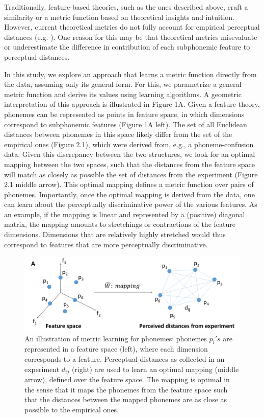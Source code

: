 Traditionally, feature-based theories, such as the ones described above, craft a similarity or a metric function based on theoretical insights and intuition. However, current theoretical metrics do not fully account for empirical perceptual distances (e.g. \citealp{Bailey2005}). One reason for this may be that theoretical metrics misevaluate or underestimate the difference in contribution of each subphonemic feature to perceptual distances. 

In this study, we explore an approach that learns a metric function directly from the data, assuming only its general form. For this, we parametrize a general metric function and derive its values using learning algorithms. A geometric interpretation of this approach is illustrated in Figure 1A. Given a feature theory, phonemes can be represented as points in feature space, in which dimensions correspond to subphonemic features (Figure 1A left). The set of all Euclidean distances between phonemes in this space likely differ from the set of the empirical ones (Figure 2.1), which were derived from, e.g., a phoneme-confusion data. Given this discrepancy between the two structures, we look for an optimal mapping between the two spaces, such that the distances from the feature space will match as closely as possible the set of distances from the experiment (Figure 2.1 middle arrow). This optimal mapping defines a metric function over pairs of phonemes. Importantly, once the optimal mapping is derived from the data, one can learn about the perceptually discriminative power of the various features. As an example, if the mapping is linear and represented by a (positive) diagonal matrix, the mapping amounts to stretchings or contractions of the feature dimensions. Dimensions that are relatively highly stretched would thus correspond to features that are more perceptually discriminative.

\begin{figure}
\vspace{.3in}
\includegraphics[width=\linewidth]{Figures/Ch2/Figure1_2017Sep10.png}
\caption{An illustration of metric learning for phonemes: phonemes $p_i's$ are represented in a feature space (left), where each dimension corresponds to a feature. Perceptual distances as collected in an experiment $d_{ij}$ (right) are used to learn an optimal mapping (middle arrow), defined over the feature space. The mapping is optimal in the sense that it maps the phonemes from the feature space such that the distances between the mapped phonemes are as close as possible to the empirical ones.}
\end{figure}

